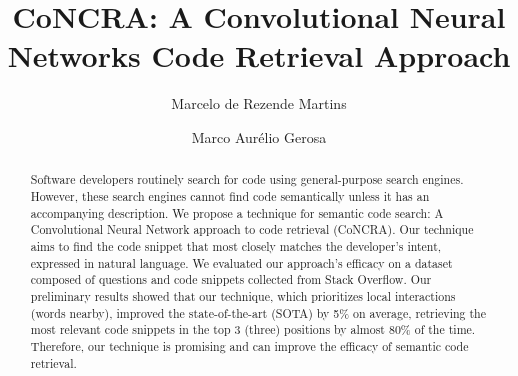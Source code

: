 \documentclass[sigconf]{acmart}
\begin{document}
\title{CoNCRA: A Convolutional Neural Networks Code Retrieval Approach}

\author{Marcelo de Rezende Martins}


\author{Marco Aurélio Gerosa}



\begin{abstract}
Software developers routinely search for code using general-purpose search engines. However, these search engines cannot find code semantically unless it has an accompanying description. We propose a technique for semantic code search: A Convolutional Neural Network approach to code retrieval (CoNCRA). Our technique aims to find the code snippet that most closely matches the developer's intent, expressed in natural language. We evaluated our approach's efficacy on a dataset composed of questions and code snippets collected from Stack Overflow. Our preliminary results showed that our technique, which prioritizes local interactions (words nearby), improved the state-of-the-art (SOTA) by 5\% on average, retrieving the most relevant code snippets in the top 3 (three) positions by almost 80\% of the time. Therefore, our technique is promising and can improve the efficacy of semantic code retrieval.
\end{abstract}
\end{document}
